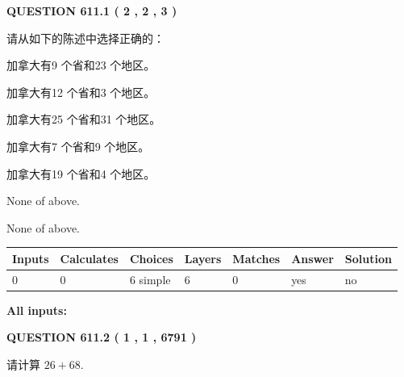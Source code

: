 \documentclass{ctexart}
\begin{document}
\vspace{0.2in}
  
{\textbf{\Large{QUESTION
611.1 
 ( 2 , 2 , 3 )
}}}
  
  
请从如下的陈述中选择正确的：
 
 
加拿大有9 个省和23 个地区。
 
 
加拿大有12 个省和3 个地区。
 
 
加拿大有25 个省和31 个地区。
 
 
加拿大有7 个省和9 个地区。
 
 
加拿大有19 个省和4 个地区。
 
 
 None of above.
 
 
\noindent{}
 
 
 None of above.
 
 
\noindent{}
 
 
   
   
   
   
\noindent\begin{tabular}{|l|l|l|l|l|l|l|}
 \hline
Inputs & Calculates & Choices & Layers & Matches & Answer & Solution \\ \hline
 0  & 
 0  & 
 6
  simple  
  & 
 6  & 
 0  & 
  yes & 
  no 
  \\ \hline
 \end{tabular}
   
   
   
   
\noindent{}
   
   
   
   
\noindent\vspace{0.1in}\hspace{-0.08in} {\textbf{\Large{All inputs: }}}
   
   
  
\vspace{0.2in}
  
{\textbf{\Large{QUESTION
611.2 
 ( 1 , 1 , 6791 )
}}}
  
  
 
请计算 $ %
26 +  %
68 $.
 
\end{document}

